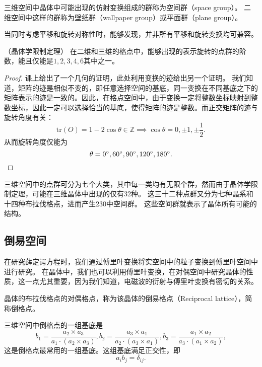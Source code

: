 \begin{definition}
    三维空间中晶体中可能出现的仿射变换组成的群称为空间群（space group）。
    二维空间中这样的群称为壁纸群（wallpaper group）或平面群（plane group）。
\end{definition}

当同时考虑平移和旋转对称性时，能够发现，并非所有平移和旋转变换均可兼容。

\begin{theorem}
    （晶体学限制定理）
    在二维和三维的格点中，能够出现的表示旋转的点群的阶数，能且仅能是$1,2,3,4,6$其中之一。
\end{theorem}

\begin{proof}
    课上给出了一个几何的证明，此处利用变换的迹给出另一个证明。
    我们知道，矩阵的迹是相似不变的，即任意选择空间的基底，同一变换在不同基底之下的矩阵表示的迹是一致的。因此，在格点空间中，由于变换一定将整数坐标映射到整数坐标，因此一定可以选择恰当的基底，使得矩阵的迹是整数。而正交矩阵的迹与旋转角度有关：
    \begin{equation}\mathrm{tr}(O) = 1 - 2 \cos \theta \in \mathbb Z \implies \cos \theta = 0, \pm 1, \pm \frac{1}{2}.\end{equation}
    从而旋转角度仅能为
    \begin{equation}\theta = 0^\circ, 60^\circ, 90^\circ, 120^\circ, 180^\circ. \qedhere\end{equation}
\end{proof}

三维空间中的点群可分为七个大类，其中每一类均有无限个群，然而由于晶体学限制定理，可能在三维晶体中出现的仅有32种。
这三十二种点群又分为七种晶系和十四种布拉伐格点，进而产生230中空间群。
这些空间群就表示了晶体所有可能的结构。

\subsection{倒易空间}

在研究薛定谔方程时，我们通过傅里叶变换将实空间中的粒子变换到傅里叶空间中进行研究。
在晶体中，我们也可以利用傅里叶变换，在对偶空间中研究晶体的性质，这一点尤其重要，因为我们知道，电磁波的衍射与傅里叶变换有密切的关系。

\begin{definition}
    晶体的布拉伐格点的对偶格点，称为该晶体的倒易格点（Reciprocal lattice），简称倒格点。
\end{definition}

\begin{proposition}
    三维空间中倒格点的一组基底是
    \begin{equation}b_1 = \frac{a_2 \times a_3}{a_1 \cdot (a_2 \times a_3)}, b_2 = \frac{a_3 \times a_1}{a_2 \cdot (a_3 \times a_1)}, b_3 = \frac{a_1 \times a_2}{a_3 \cdot (a_1 \times a_2)},\end{equation}
    这是倒格点最常用的一组基底。这组基底满足正交性，即
    \begin{equation}a_i b_j = \delta_{ij}.\end{equation}
\end{proposition}

